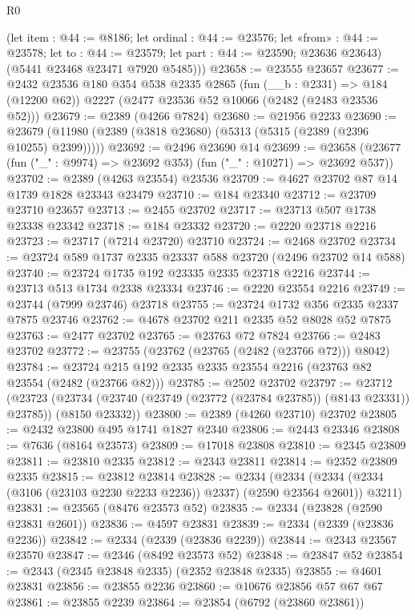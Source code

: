 \begin{lexlean}{R0}
\begin{coremodule}
        (let item : @44 := @8186;
        let ordinal : @44 := @23576;
        let «from» : @44 := @23578; let to : @44 := @23579; let part : @44 := @23590; @23636 @23643)
        (@5441 @23468 @23471 @7920 @5485)))
@23658 := @23555 @23657
@23677 := @2432
    @23536
    @180
    @354
    @538
    @2335
    @2865
    (fun (__b : @2331) => @184 (@12200 @62))
    @2227
    (@2477 @23536 @52 @10066 (@2482 (@2483 @23536 @52)))
@23679 := @2389 (@4266 @7824)
@23680 := @21956 @2233
@23690 := @23679 (@11980 (@2389 (@3818 @23680) (@5313 (@5315 (@2389 (@2396 @10255) @2399)))))
@23692 := @2496 @23690 @14
@23699 := @23658 (@23677 (fun ("_" : @9974) => @23692 @353) (fun ("_" : @10271) => @23692 @537))
@23702 := @2389 (@4263 @23554) @23536
@23709 := @4627 @23702 @87 @14 @1739 @1828 @23343 @23479
@23710 := @184 @23340
@23712 := @23709 @23710 @23657
@23713 := @2455 @23702
@23717 := @23713 @507 @1738 @23338 @23342
@23718 := @184 @23332
@23720 := @2220 @23718 @2216
@23723 := @23717 (@7214 @23720) @23710
@23724 := @2468 @23702
@23734 := @23724 @589 @1737 @2335 @23337 @588 @23720 (@2496 @23702 @14 @588)
@23740 := @23724 @1735 @192 @23335 @2335 @23718 @2216
@23744 := @23713 @513 @1734 @2338 @23334
@23746 := @2220 @23554 @2216
@23749 := @23744 (@7999 @23746) @23718
@23755 := @23724 @1732 @356 @2335 @2337 @7875 @23746
@23762 := @4678 @23702 @211 @2335 @52 @8028 @52 @7875
@23763 := @2477 @23702
@23765 := @23763 @72 @7824
@23766 := @2483 @23702
@23772 := @23755 (@23762 (@23765 (@2482 (@23766 @72))) @8042)
@23784 := @23724 @215 @192 @2335 @2335 @23554 @2216 (@23763 @82 @23554 (@2482 (@23766 @82)))
@23785 := @2502 @23702
@23797 := @23712
    (@23723
      (@23734 (@23740 (@23749 (@23772 (@23784 @23785)) (@8143 @23331)) @23785))
      (@8150 @23332))
@23800 := @2389 (@4260 @23710) @23702
@23805 := @2432 @23800 @495 @1741 @1827 @2340
@23806 := @2443 @23346
@23808 := @7636 (@8164 @23573)
@23809 := @17018 @23808
@23810 := @2345 @23809
@23811 := @23810 @2335
@23812 := @2343 @23811
@23814 := @2352 @23809 @2335
@23815 := @23812 @23814
@23828 := @2334
    (@2334 (@2334 (@2334 (@3106 (@23103 @2230 @2233 @2236)) @2337) (@2590 @23564 @2601)) @3211)
@23831 := @23565 (@8476 @23573 @52)
@23835 := @2334 (@23828 (@2590 @23831 @2601))
@23836 := @4597 @23831
@23839 := @2334 (@2339 (@23836 @2236))
@23842 := @2334 (@2339 (@23836 @2239))
@23844 := @2343 @23567 @23570
@23847 := @2346 (@8492 @23573 @52)
@23848 := @23847 @52
@23854 := @2343 (@2345 @23848 @2335) (@2352 @23848 @2335)
@23855 := @4601 @23831
@23856 := @23855 @2236
@23860 := @10676 @23856 @57 @67 @67
@23861 := @23855 @2239
@23864 := @23854 (@6792 (@23860 @23861))

\end{coremodule}
\end{lexlean}

